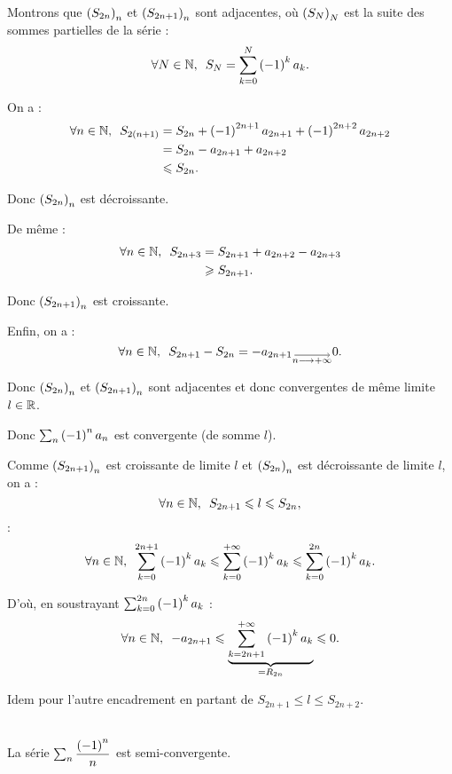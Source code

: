 \begin{dem}
Montrons que \(\left(S_{2n}\right)_n\) et \(\left(S_{2n+1}\right)_n\) sont adjacentes, où \(\left(S_N\right)_N\) est la suite des sommes partielles de la série : \[\quantifs{\forall N\in\N}S_N=\sum_{k=0}^N\paren{-1}^ka_k.\]

On a : \[\begin{aligned}
\quantifs{\forall n\in\N}S_{2\paren{n+1}}&=S_{2n}+\paren{-1}^{2n+1}a_{2n+1}+\paren{-1}^{2n+2}a_{2n+2} \\
&=S_{2n}-a_{2n+1}+a_{2n+2} \\
&\leq S_{2n}.
\end{aligned}\]

Donc \(\left(S_{2n}\right)_n\) est décroissante.

De même : \[\begin{aligned}
\quantifs{\forall n\in\N}S_{2n+3}&=S_{2n+1}+a_{2n+2}-a_{2n+3} \\
&\geq S_{2n+1}.
\end{aligned}\]

Donc \(\left(S_{2n+1}\right)_n\) est croissante.

Enfin, on a : \[\quantifs{\forall n\in\N}S_{2n+1}-S_{2n}=-a_{2n+1}\tendqd{n\to\pinf}0.\]

Donc \(\left(S_{2n}\right)_n\) et \(\left(S_{2n+1}\right)_n\) sont adjacentes et donc convergentes de même limite \(l\in\mathbb{R}\).

Donc \(\sum_n\left(-1\right)^na_n\) est convergente (de somme \(l\)).
\end{dem}

\begin{dem}[Encadrements]
Comme \(\left(S_{2n+1}\right)_n\) est croissante de limite \(l\) et \(\left(S_{2n}\right)_n\) est décroissante de limite \(l\), on a : \[\quantifs{\forall n\in\N}S_{2n+1}\leq l\leq S_{2n},\] \cad : \[\quantifs{\forall n\in\N}\sum_{k=0}^{2n+1}\paren{-1}^ka_k\leq\sum_{k=0}^{\pinf}\paren{-1}^ka_k\leq\sum_{k=0}^{2n}\paren{-1}^ka_k.\]

D'où, en soustrayant \(\sum_{k=0}^{2n}\left(-1\right)^ka_k\) : \[\quantifs{\forall n\in\N}-a_{2n+1}\leq\underbrace{\sum_{k=2n+1}^{\pinf}\paren{-1}^ka_k}_{=R_{2n}}\leq0.\]

Idem pour l'autre encadrement en partant de \(S_{2n+1}\leq l\leq S_{2n+2}\).
\end{dem}

\begin{ex}~\\
La série \(\sum_{n}\dfrac{\left(-1\right)^n}{n}\) est semi-convergente.
\end{ex}

